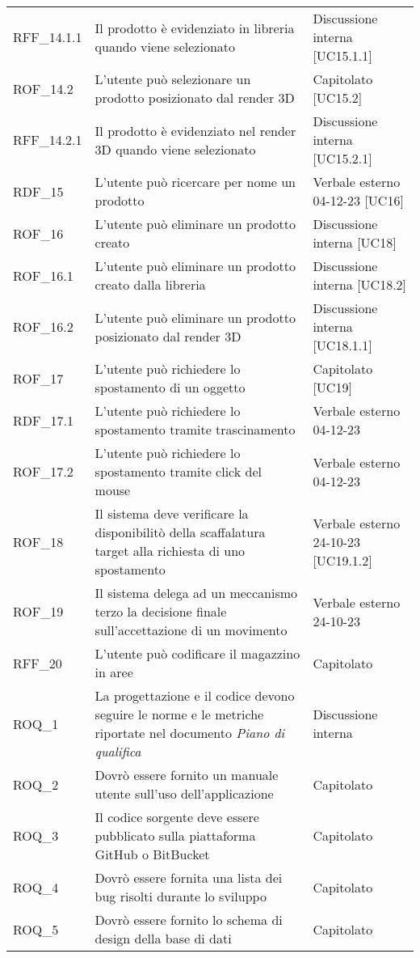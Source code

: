\begin{xltabular}{\textwidth}{ p{0.2\textwidth} | X | p{0.2\textwidth} }
    RFF\_14.1.1& Il prodotto è evidenziato in libreria quando viene selezionato & Discussione interna [UC15.1.1]\\
    ROF\_14.2& L'utente può selezionare un prodotto posizionato dal render 3D & Capitolato [UC15.2]\\
    RFF\_14.2.1& Il prodotto è evidenziato nel render 3D quando viene selezionato & Discussione interna [UC15.2.1]\\
    RDF\_15& L'utente può ricercare per nome un prodotto & Verbale esterno 04-12-23 [UC16]\\
    ROF\_16& L'utente può eliminare un prodotto creato & Discussione interna [UC18]\\
    ROF\_16.1& L'utente può eliminare un prodotto creato dalla libreria & Discussione interna [UC18.2]\\
    ROF\_16.2& L'utente può eliminare un prodotto posizionato dal render 3D & Discussione interna [UC18.1.1]\\
    ROF\_17& L'utente può richiedere lo spostamento di un oggetto & Capitolato [UC19]\\
    RDF\_17.1& L'utente può richiedere lo spostamento tramite trascinamento & Verbale esterno 04-12-23\\
    ROF\_17.2& L'utente può richiedere lo spostamento tramite click del mouse & Verbale esterno 04-12-23\\
    ROF\_18& Il sistema deve verificare la disponibilitò della scaffalatura target alla richiesta di uno spostamento & Verbale esterno 24-10-23 [UC19.1.2]\\
    ROF\_19& Il sistema delega ad un meccanismo terzo la decisione finale sull'accettazione di un movimento & Verbale esterno 24-10-23\\
    RFF\_20& L'utente può codificare il magazzino in aree & Capitolato \\
    ROQ\_1& La progettazione e il codice devono seguire le norme e le metriche riportate nel documento \textit{Piano di qualifica} & Discussione interna \\
    ROQ\_2& Dovrò essere fornito un manuale utente sull'uso dell'applicazione & Capitolato \\
    ROQ\_3& Il codice sorgente deve essere pubblicato sulla piattaforma GitHub o BitBucket & Capitolato \\
    ROQ\_4& Dovrò essere fornita una lista dei bug risolti durante lo sviluppo & Capitolato  \\
    ROQ\_5& Dovrò essere fornito lo schema di design della base di dati & Capitolato  \\

\end{xltabular}
